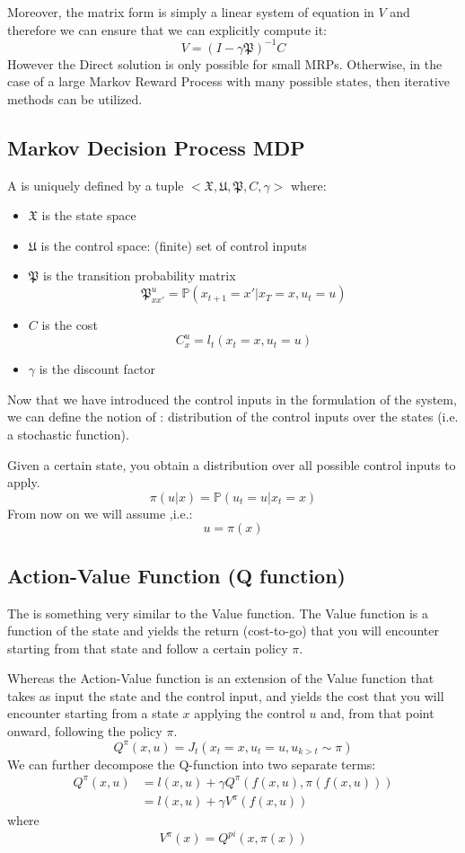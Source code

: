 Moreover, the matrix form is simply a linear system of equation in $V$ and therefore we can ensure that we can explicitly compute it:
\[V=(I-\gamma \mathfrak{P})^{-1}C\]
However the Direct solution is only possible for small MRPs. Otherwise, in the case of a large Markov Reward Process with many possible states, then iterative methods can be utilized.

\subsection{Markov Decision Process MDP}
A  is uniquely defined by a tuple $<\mathfrak{X}, \mathfrak{U}, \mathfrak{P},C, \gamma>$
where:
\begin{itemize}
\item $\mathfrak{X}$ is the state space
\item $\mathfrak{U}$ is the control space: (finite) set of control inputs
\item $\mathfrak{P}$ is the transition probability matrix
\[\mathfrak{P}_{xx'}^u = \mathbb{P}(x_{t+1}=x'|x_T=x, u_t = u)\]
\item $C$ is the cost
\[C_x^u = l_t(x_t=x, u_t=u)\]
\item $\gamma$ is the discount factor
\end{itemize}
 Now that we have introduced the control inputs in the formulation of the system, we can define the notion of : distribution of the control inputs over the states (i.e. a stochastic function).
 
 Given a certain state, you obtain a distribution over all possible control inputs to apply.
 \[\pi(u|x) = \mathbb{P}(u_t=u|x_t=x)\]
 From now on we will assume ,i.e.:
 \[u = \pi(x)\]

\subsection{Action-Value Function (Q function)}
The  is something very similar to the Value function. The Value function is a function of the state and yields the return (cost-to-go) that you will encounter starting from that state and follow a certain policy $\pi$.

Whereas the Action-Value function is an extension of the Value function that takes as input the state and the control input, and yields the cost that you will encounter starting from a state $x$ applying the control $u$ and, from that point onward, following the policy $\pi$.
\[Q^{\pi}(x,u) = J_t(x_t=x, u_t=u, u_{k>t}\sim \pi)\]
We can further decompose the Q-function into two separate terms:
\begin{align*}
Q^{\pi}(x,u) &= l(x,u) + \gamma Q^{\pi}(f(x,u), \pi(f(x,u)))\\
&= l(x,u) + \gamma V^{\pi}(f(x,u))
\end{align*}
where
\[V^{\pi}(x) = Q^{pi}(x,\pi(x))\]

